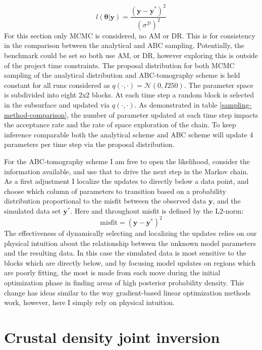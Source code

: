 \begin{equation}
	l(\bm{\theta}|\bm{y}) = \frac{(\bm{y}-\bm{y^*})^2}{(\sigma^{\mathcal{D}})^2}
\end{equation}
For this section only MCMC is considered, no AM or DR. This is for consistency in the comparison between the analytical and ABC sampling. Potentially, the benchmark could be set so both use AM, or DR, however exploring this is outside of the project time constraints. The proposal distribution for both MCMC sampling of the analytical distribution and ABC-tomography scheme is held constant for all runs considered as $q(\cdot,\cdot) = \mathcal{N}(0,I250)$. The parameter space is subdivided into eight 2x2 blocks. At each time step a random block is selected in the subsurface and updated via $q(\cdot,\cdot)$. As demonstrated in table \ref{sampling-method-comparison}, the number of parameter updated at each time step impacts the acceptance rate and the rate of space exploration of the chain. To keep inference comparable both the analytical scheme and ABC scheme will update 4 parameters per time step via the proposal distribution.\par


For the ABC-tomography scheme I am free to open the likelihood, consider the information available, and use that to drive the next step in the Markov chain. As a first adjustment I localize the updates to directly below a data point, and choose which column of parameters to transition based on a probability distribution proportional to the misfit between the observed data $\bm{y}$, and the simulated data set $\bm{y^*}$. Here and throughout misfit is defined by the L2-norm:
\begin{equation}
	\text{misfit} = (\bm{y}-\bm{y^*})^2
\end{equation}
The effectiveness of dynamically selecting and localizing the updates relies on our physical intuition about the relationship between the unknown model parameters and the resulting data. In this case the simulated data is most sensitive to the blocks which are directly below, and by focusing model updates on regions which are poorly fitting, the most is made from each move during the initial optimization phase in finding areas of high posterior probability density. This change has ideas similar to the way gradient-based linear optimization methods work, however, here I simply rely on physical intuition. \par





\section{Crustal density joint inversion}